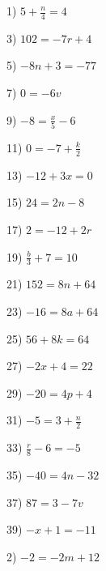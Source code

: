 \begin{multicols}{2}
  1) $5 + \frac{n}{4} = 4$ \ \ \ \ \ \ \ \ \ \ \ \ \ \ \ \ \ \ \ \ \ \ \ \ \ \
  \ \ \ \ \ \ \
  
  3) $102 = - 7 r + 4$ \ \ \ \ \ \ \ \ \ \ \ \ \ \ \ \ \ \ \ \ \ \ \ \ \ \ \
  
  5) $- 8 n + 3 = - 77$ \ \ \ \ \ \ \ \ \ \ \ \ \ \ \ \ \ \ \ \ \ \ \ \ \
  
  7) $0 = - 6 v$ \ \ \ \ \ \ \ \ \ \ \ \ \ \ \ \ \ \ \ \ \ \ \ \ \ \ \ \ \ \
  \ \ \ \
  
  9) $- 8 = \frac{x}{5} - 6$ \ \ \ \ \ \ \ \ \ \ \ \ \ \ \ \ \ \ \ \ \ \ \ \
  \ \ \ \ \ \
  
  11) $0 = - 7 + \frac{k}{2}$ \ \ \ \ \ \ \ \ \ \ \ \ \ \ \ \ \ \ \ \ \ \ \ \
  \ \ \ \ \
  
  13) $- 12 + 3 x = 0$ \ \ \ \ \ \ \ \ \ \ \ \ \ \ \ \ \ \ \ \ \ \ \ \ \ \
  
  15) $24 = 2 n - 8$ \ \ \ \ \ \ \ \ \ \ \ \ \ \ \ \ \ \ \ \ \ \ \ \ \ \ \ \
  \
  
  17) $2 = - 12 + 2 r$ \ \ \ \ \ \ \ \ \ \ \ \ \ \ \ \ \ \ \ \ \ \ \ \ \ \ \
  
  19) $\frac{b}{3} + 7 = 10$ \ \ \ \ \ \ \ \ \ \ \ \ \ \ \ \ \ \ \ \ \ \ \ \
  \ \ \ \ \ \ \
  
  21) $152 = 8 n + 64$ \ \ \ \ \ \ \ \ \ \ \ \ \ \ \ \ \ \ \ \ \ \ \ \ \ \ \
  
  23) $- 16 = 8 a + 64$ \ \ \ \ \ \ \ \ \ \ \ \ \ \ \ \ \ \ \ \ \ \ \ \ \
  
  25) $56 + 8 k = 64$ \ \ \ \ \ \ \ \ \ \ \ \ \ \ \ \ \ \ \ \ \ \ \ \ \ \ \ \
  \
  
  27) $- 2 x + 4 = 22$ \ \ \ \ \ \ \ \ \ \ \ \ \ \ \ \ \ \ \ \ \ \ \ \ \ \ \
  
  29) $- 20 = 4 p + 4$ \ \ \ \ \ \ \ \ \ \ \ \ \ \ \ \ \ \ \ \ \ \ \ \ \ \ \
  
  31) $- 5 = 3 + \frac{n}{2}$ \ \ \ \ \ \ \ \ \ \ \ \ \ \ \ \ \ \ \ \ \ \ \ \
  \ \ \ \ \
  
  33) $\frac{r}{8} - 6 = - 5$ \ \ \ \ \ \ \ \ \ \ \ \ \ \ \ \ \ \ \ \ \ \ \ \
  \ \ \ \ \
  
  35) $- 40 = 4 n - 32$ \ \ \ \ \ \ \ \ \ \ \ \ \ \ \ \ \ \ \ \ \ \ \ \
  
  37) $87 = 3 - 7 v$ \ \ \ \ \ \ \ \ \ \ \ \ \ \ \ \ \ \ \ \ \ \ \ \ \ \ \ \
  \ \
  
  39) $- x + 1 = - 11$ \ \ \ \ \ \ \ \ \ \ \ \ \ \ \ \ \ \ \ \ \ \ \ \ \ \ \
  \ \ \ \ \ \ \ \ \
  
  2) $- 2 = - 2 m + 12$
  

\end{multicols}
